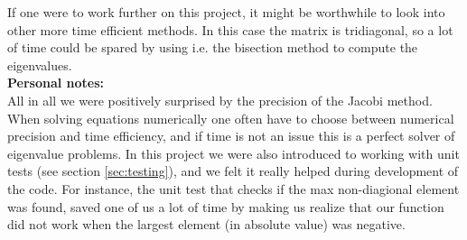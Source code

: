 \documentclass[12pt]{article}
\numberwithin{figure}{section}
\numberwithin{table}{section}
\begin{document}
If one were to work further on this project, it might be worthwhile to look into other more time efficient methods. In this case the matrix is tridiagonal, so a lot of time could be spared by using i.e. the bisection method to compute the eigenvalues.\\

\noindent \textbf{Personal notes:}\\
All in all we were positively surprised by the precision of the Jacobi method. When solving equations numerically one often have to choose between numerical precision and time efficiency, and if time is not an issue this is a perfect solver of eigenvalue problems. In this project we were also introduced to working with unit tests (see section \ref{sec:testing}), and we felt it really helped during development of the code. For instance, the unit test that checks if the max non-diagional element was found, saved one of us a lot of time by making us realize that our function did not work when the largest element (in absolute value) was negative.


\pagebreak


{}

\end{document}
